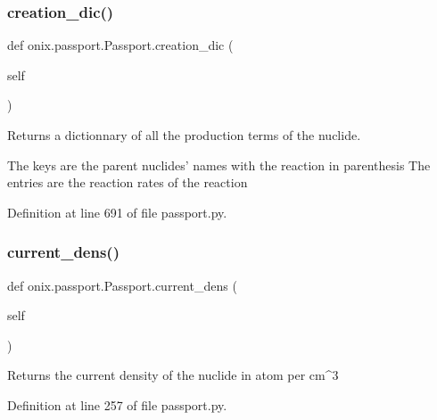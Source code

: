 \subsubsection{\texorpdfstring{creation\+\_\+dic()}{creation\_dic()}}
{\footnotesize\ttfamily def onix.\+passport.\+Passport.\+creation\+\_\+dic (\begin{DoxyParamCaption}\item[{}]{self }\end{DoxyParamCaption})}

\begin{DoxyVerb}Returns a dictionnary of all the production terms of the nuclide.

The keys are the parent nuclides' names with the reaction in parenthesis
The entries are the reaction rates of the reaction\end{DoxyVerb}
 

Definition at line 691 of file passport.\+py.

\mbox{\label{classonix_1_1passport_1_1Passport_a3037da11a2c0ffa2767041d81e7441d0}} 
\subsubsection{\texorpdfstring{current\+\_\+dens()}{current\_dens()}\hspace{0.1cm}{\footnotesize\ttfamily [1/2]}}
{\footnotesize\ttfamily def onix.\+passport.\+Passport.\+current\+\_\+dens (\begin{DoxyParamCaption}\item[{}]{self }\end{DoxyParamCaption})}

\begin{DoxyVerb}Returns the current density of the nuclide in atom per cm^3\end{DoxyVerb}
 

Definition at line 257 of file passport.\+py.

\mbox{\label{classonix_1_1passport_1_1Passport_a40845de819111810c0a3aa428a93206e}} 
